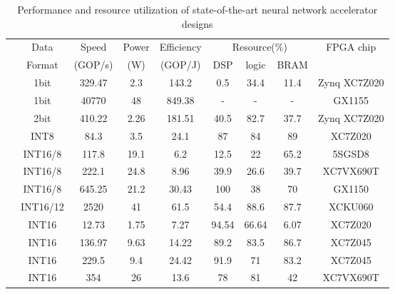\begin{table}[htbp]
    \centering
    \caption{Performance and resource utilization of state-of-the-art neural network accelerator designs}
    \begin{tabular}{|r|c|c|c|c|c|c|c|c|}
        \hline
        \multicolumn{1}{|c|}{} & Data  & Speed & Power & Efficiency & \multicolumn{3}{c|}{Resource(\%)} & \multirow{2}[4]{*}{FPGA chip} \bigstrut\\
    \cline{6-8}    \multicolumn{1}{|c|}{} & Format & (GOP/s) & (W)   & (GOP/J) & DSP   & logic & BRAM  &  \bigstrut\\
        \hline
            \cite{nakahara2017fully}    & 1bit      & 329.47    & 2.3   & 143.2 & 0.5   & 34.4  & 11.4  & Zynq XC7Z020 \\ \hline
            \cite{moss2017high}         & 1bit      & 40770     & 48    & 849.38 &   -   &   -   &   -   & GX1155 \\ \hline
            \cite{jiao2017accelerating} & 2bit      & 410.22    & 2.26  & 181.51 & 40.5  & 82.7  & 37.7  & Zynq XC7Z020 \\ \hline
            \cite{guo2017angel}         & INT8      & 84.3      & 3.5   & 24.1  & 87    & 84    & 89    & XC7Z020 \\ \hline
            \cite{suda2016throughput}   & INT16/8   & 117.8     & 19.1  & 6.2   & 12.5  & 22    & 65.2  & 5SGSD8 \\ \hline
            \cite{liu2016automatic}     & INT16/8   & 222.1     & 24.8  & 8.96  & 39.9  & 26.6  & 39.7  & XC7VX690T \\ \hline
            \cite{ma2017optimizing}     & INT16/8   & 645.25    & 21.2  & 30.43 & 100   & 38    & 70    & GX1150 \\ \hline            
            \cite{han2017ese}           & INT16/12  & 2520      & 41    & 61.5  & 54.4  & 88.6  & 87.7  & XCKU060 \\ \hline
            \cite{venieris2017fpgaconvnet} & INT16  & 12.73     & 1.75  & 7.27  & 94.54 & 66.64 & 6.07  & XC7Z020 \\ \hline
            \cite{qiu2016going}         & INT16     & 136.97    & 9.63  & 14.22 & 89.2  & 83.5  & 86.7  & XC7Z045 \\ \hline
            \cite{xiao2017exploring}    & INT16     & 229.5     & 9.4   & 24.42 & 91.9  & 71    & 83.2  & XC7Z045 \\ \hline
            \cite{zhang2016caffeine}    & INT16     & 354       & 26    & 13.6  & 78    & 81    & 42    & XC7VX690T \\ \hline

\end{tabular}
\end{table}
